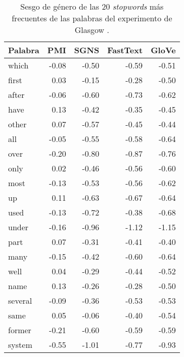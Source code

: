 

\begin{table}[h]
  \centering
  \begin{tabular}{lrrrr}
    \toprule
    Palabra & PMI   & SGNS  & FastText & GloVe \\
    \midrule
    which   & -0.08 & -0.50 & -0.59    & -0.51 \\
    first   & 0.03  & -0.15 & -0.28    & -0.50 \\
    after   & -0.06 & -0.60 & -0.73    & -0.62 \\
    have    & 0.13  & -0.42 & -0.35    & -0.45 \\
    other   & 0.07  & -0.57 & -0.45    & -0.44 \\
    all     & -0.05 & -0.55 & -0.58    & -0.64 \\
    over    & -0.20 & -0.80 & -0.87    & -0.76 \\
    only    & 0.02  & -0.46 & -0.56    & -0.60 \\
    most    & -0.13 & -0.53 & -0.56    & -0.62 \\
    up      & 0.11  & -0.63 & -0.67    & -0.64 \\
    used    & -0.13 & -0.72 & -0.38    & -0.68 \\
    under   & -0.16 & -0.96 & -1.12    & -1.15 \\
    part    & 0.07  & -0.31 & -0.41    & -0.40 \\
    many    & -0.15 & -0.42 & -0.60    & -0.64 \\
    well    & 0.04  & -0.29 & -0.44    & -0.52 \\
    name    & 0.13  & -0.26 & -0.28    & -0.50 \\
    several & -0.09 & -0.36 & -0.53    & -0.53 \\
    same    & 0.05  & -0.06 & -0.40    & -0.54 \\
    former  & -0.21 & -0.60 & -0.59    & -0.59 \\
    system  & -0.55 & -1.01 & -0.77    & -0.93 \\
    \bottomrule
  \end{tabular}
  \caption{
    Sesgo de género de las 20 \emph{stopwords} más frecuentes de las palabras del experimento de Glasgow \citep{scott2019glasgow}.
  }
  \label{tab:stopwords}
\end{table}

